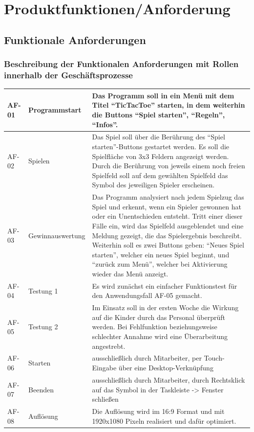 \documentclass[12pt]{article}
\begin{document}
\section{Produktfunktionen/Anforderung}
\subsection{Funktionale Anforderungen}
\subsubsection{Beschreibung der Funktionalen Anforderungen mit Rollen innerhalb der Geschäftsprozesse}
\begin{tabularx}{\textwidth}{|l|l|X|} \hline
AF-01&Programmstart&Das Programm soll in ein Menü mit dem Titel "`\Gls{TicTacToe}"' starten, in dem weiterhin die \Glspl{Button} "`Spiel starten"', "`Regeln"', "`Infos"'.\\ \hline
AF-02&Spielen&Das Spiel soll über die Berührung des "`Spiel starten"'-\Glspl{Button} gestartet werden. Es soll die Spielfläche von 3x3 Feldern angezeigt werden. Durch die Berührung von jeweils einem noch freien Spielfeld soll auf dem gewählten Spielfeld das Symbol des jeweiligen Spieler erscheinen.\\ \hline
AF-03&Gewinnauswertung&Das Programm analysiert nach jedem Spielzug das Spiel und erkennt, wenn ein Spieler gewonnen hat oder ein Unentschieden entsteht. Tritt einer dieser Fälle ein, wird das Spielfeld ausgeblendet und eine Meldung gezeigt, die das Spielergebnis beschreibt. Weiterhin soll es zwei \Glspl{Button} geben: "`Neues Spiel starten"', welcher ein neues Spiel beginnt, und "`zurück zum Menü"', welcher bei Aktivierung wieder das Menü anzeigt.\\ \hline
AF-04&Testung 1&Es wird zunächst ein einfacher Funktionstest für den Anwendungsfall AF-05 gemacht. \\ \hline
AF-05&Testung 2&Im Einsatz soll in der ersten Woche die Wirkung auf die Kinder durch das Personal überprüft werden. Bei Fehlfunktion beziehungsweise schlechter Annahme wird eine Überarbeitung angestrebt.\\ \hline
AF-06&Starten&ausschließlich durch Mitarbeiter, per Touch-Eingabe über eine Desktop-Verknüpfung\\ \hline
AF-07&Beenden&ausschließlich durch Mitarbeiter, durch Rechtsklick auf das Symbol in der Taskleiste -> Fenster schließen\\ \hline
AF-08&Auflösung&Die Auflösung wird im 16:9 Format und mit 1920x1080 Pixeln realisiert und dafür optimiert.\\ \hline
\end{tabularx}\\\\
\end{document}
